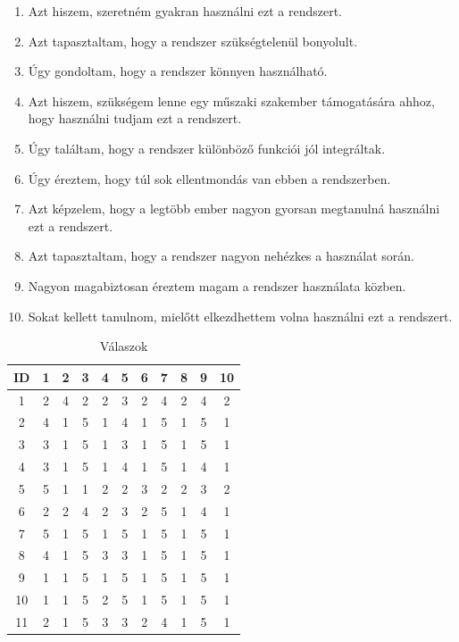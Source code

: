 \begin{enumerate}
    \item Azt hiszem, szeretném gyakran használni ezt a rendszert.
    \item Azt tapasztaltam, hogy a rendszer szükségtelenül bonyolult.
    \item Úgy gondoltam, hogy a rendszer könnyen használható.
    \item Azt hiszem, szükségem lenne egy műszaki szakember támogatására ahhoz, hogy használni tudjam ezt a rendszert.
    \item Úgy találtam, hogy a rendszer különböző funkciói jól integráltak.
    \item Úgy éreztem, hogy túl sok ellentmondás van ebben a rendszerben.
    \item Azt képzelem, hogy a legtöbb ember nagyon gyorsan megtanulná használni ezt a rendszert.
    \item Azt tapasztaltam, hogy a rendszer nagyon nehézkes a használat során.
    \item Nagyon magabiztosan éreztem magam a rendszer használata közben.
    \item Sokat kellett tanulnom, mielőtt elkezdhettem volna használni ezt a rendszert.
\end{enumerate}

\begin{table}[h]
    \centering
    \begin{tabular}{|c|c|c|c|c|c|c|c|c|c|c|}
        \hline
        ID & 1 & 2 & 3 & 4 & 5 & 6 & 7 & 8 & 9 & 10 \\ \hline
        1  & 2 & 4 & 2 & 2 & 3 & 2 & 4 & 2 & 4 & 2  \\ \hline
        2  & 4 & 1 & 5 & 1 & 4 & 1 & 5 & 1 & 5 & 1  \\ \hline
        3  & 3 & 1 & 5 & 1 & 3 & 1 & 5 & 1 & 5 & 1  \\ \hline
        4  & 3 & 1 & 5 & 1 & 4 & 1 & 5 & 1 & 4 & 1  \\ \hline
        5  & 5 & 1 & 1 & 2 & 2 & 3 & 2 & 2 & 3 & 2  \\ \hline
        6  & 2 & 2 & 4 & 2 & 3 & 2 & 5 & 1 & 4 & 1  \\ \hline
        7  & 5 & 1 & 5 & 1 & 5 & 1 & 5 & 1 & 5 & 1  \\ \hline
        8  & 4 & 1 & 5 & 3 & 3 & 1 & 5 & 1 & 5 & 1  \\ \hline
        9  & 1 & 1 & 5 & 1 & 5 & 1 & 5 & 1 & 5 & 1  \\ \hline
        10 & 1 & 1 & 5 & 2 & 5 & 1 & 5 & 1 & 5 & 1  \\ \hline
        11 & 2 & 1 & 5 & 3 & 3 & 2 & 4 & 1 & 5 & 1  \\ \hline
    \end{tabular}
    \caption{Válaszok}
    \label{tab:sus_data}
\end{table}

